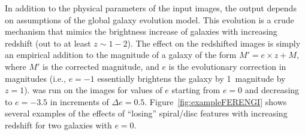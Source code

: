 \documentclass[twocolumn]{aastex6}
\begin{document}

In addition to the physical parameters of the input images, the \ferengi{} output depends on assumptions of the global galaxy evolution model. This evolution is a crude mechanism that mimics the brightness increase of galaxies with increasing redshift (out to at least $z\sim1-2$). The effect on the redshifted images is simply an empirical addition to the magnitude of a galaxy of the form $M' = e\times z + M$, where $M'$ is the corrected magnitude, and $e$ is the evolutionary correction in magnitudes (i.e., $e=-1$ essentially brightens the galaxy by 1~magnitude by $z=1$). \ferengi{} was run on the images for values of $e$ starting from $e=0$ and decreasing to $e=-3.5$ in increments of $\Delta e = 0.5$. Figure~\ref{fig:exampleFERENGI} shows several examples of the effects of ``losing'' spiral/disc features with increasing redshift for two galaxies with $e=0$. 
\end{document}
